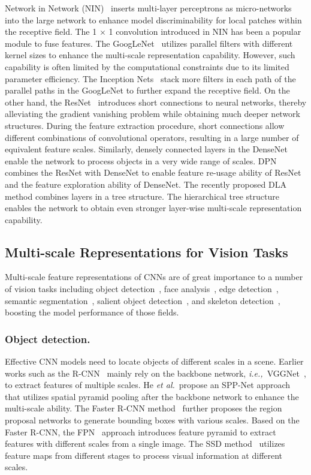 \documentclass[10pt,journal,cspaper,compsoc]{IEEEtran}
\newcommand{\myPara}[1]{\subsubsection{#1}}
\def\ie{\emph{i.e.,~}}
\def\etal{{\em et al.}}
\def\etal{{\em et al.}}
\begin{document}
Network in Network (NIN)~\cite{lin2013network} inserts multi-layer 
perceptrons as micro-networks into the large network 
to enhance model discriminability for local patches within the receptive field.
The 1 $\times$ 1 convolution introduced in NIN has been a popular module to fuse features.
%
The GoogLeNet~\cite{szegedy2015going}
utilizes parallel filters with different kernel sizes
to enhance the multi-scale representation capability.
%
However, such capability is often limited by the computational constraints
due to its limited parameter efficiency.
%
The Inception Nets~\cite{szegedy2016rethinking,szegedy2017inception}
stack more filters in each path of the parallel paths in the GoogLeNet
to further expand the receptive field.
%
On the other hand, the ResNet~\cite{he2016deep} introduces short connections
to neural networks,
thereby alleviating the gradient vanishing problem while
obtaining much deeper network structures.
%
During the feature extraction procedure,
short connections allow different combinations of convolutional operators,
resulting in a large number of equivalent feature scales.
%
Similarly, densely connected layers in the DenseNet~\cite{huang2017densely}
enable the network to process objects in a very wide range of scales.
%
DPN~\cite{chen2017dual} combines the ResNet with DenseNet to 
enable feature re-usage ability of ResNet and the feature exploration 
ability of DenseNet.
%
The recently proposed DLA~\cite{yu2018deep} method combines layers in a 
tree structure.
%
The hierarchical tree structure enables the network to obtain even stronger
layer-wise multi-scale representation capability.


\subsection{Multi-scale Representations for Vision Tasks}

Multi-scale feature representations of CNNs are of great importance to
a number of vision tasks including object detection~\cite{ren2015faster},
face analysis~\cite{bulat2017far,najibi2017ssh},
edge detection~\cite{liu2017richer},
semantic segmentation~\cite{chen2018deeplab},
salient object detection~\cite{Liu2019PoolSal,Zhao2019RgbdSal}, 
and skeleton detection~\cite{zhao2018hifi},
boosting the model performance of those fields.
%

\myPara{Object detection.}
Effective CNN models need to locate objects of different scales in a scene.
%
Earlier works such as the R-CNN~\cite{girshick2014rich} mainly rely on
the backbone network, \ie VGGNet~\cite{simonyan2014very},
to extract features of multiple scales.
%
He \etal~propose an SPP-Net approach~\cite{he2015spatial} that utilizes
spatial pyramid pooling after the backbone network
to enhance the multi-scale ability.
%
The Faster R-CNN method~\cite{ren2015faster} further proposes
the region proposal networks to generate bounding boxes with various scales.
%
Based on the Faster R-CNN, the FPN~\cite{lin2017feature} approach 
introduces feature pyramid
to extract features with different scales from a single image.
%
The SSD method~\cite{liu2016ssd} utilizes feature maps from different stages
to process visual information at different scales.
\end{document}
